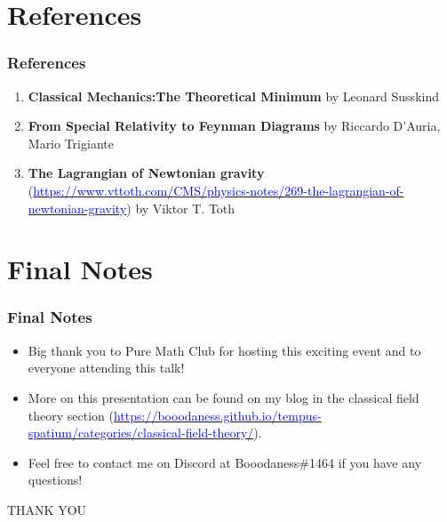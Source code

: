 \documentclass{beamer}
\begin{document}
\section{References}

\begin{frame}
\frametitle{References}

\begin{enumerate}
\item \textbf{Classical Mechanics:The Theoretical Minimum} by Leonard Susskind

\item \textbf{From Special Relativity to Feynman Diagrams} by Riccardo D'Auria, Mario Trigiante

\item \textbf{The Lagrangian of Newtonian gravity} (\href{https://www.vttoth.com/CMS/physics-notes/269-the-lagrangian-of-newtonian-gravity}{\textcolor{blue}{https://www.vttoth.com/CMS/physics-notes/269-the-lagrangian-of-newtonian-gravity}}) by Viktor T. Toth
\end{enumerate}
\end{frame}

\section{Final Notes}

\begin{frame}
\frametitle{Final Notes}

\begin{itemize}
\item Big thank you to Pure Math Club for hosting this exciting event and to everyone attending this talk!

\item More on this presentation can be found on my blog in the classical field theory section (\href{https://booodaness.github.io/tempus-spatium/categories/classical-field-theory/}{\textcolor{blue}{https://booodaness.github.io/tempus-spatium/categories/classical-field-theory/}}).

\item Feel free to contact me on Discord at Booodaness\#1464 if you have any questions!
\end{itemize}
\end{frame}

\begin{frame}
\begin{center}
\Huge \textcolor{blue!50!gray}{THANK YOU}
\end{center}
\end{frame}
\end{document}
